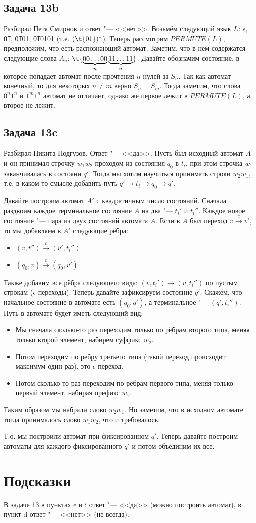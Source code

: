 \subsection{Задача 13b}
	Разбирал Петя Смирнов и ответ "--- <<нет>>.
	Возьмём следующий язык $L$: $\epsilon$, \t{01}, \t{0101}, \t{010101} (т.е. $(\t{01})^*$).
	Теперь рассмотрим $PERMUTE(L)$, предположим, что есть распознающий автомат.
	Заметим, что в нём содержатся следующие слова $A_n$: $\t{\underbrace{00\dots00}_{n}\underbrace{11\dots11}_{n}}$.
	Давайте обозначим состояние, в которое попадает автомат после прочтения $n$ нулей за $S_n$.
	Так как автомат конечный, то для некоторых $n \neq m$ верно $S_n=S_m$.
	Тогда заметим, что слова $0^n1^n$ и $1^m1^n$ автомат не отличает, однако же первое лежит в $PERMUTE(L)$,
	а второе не лежит.

\subsection{Задача 13c}
	Разбирал Никита Подгузов.
	Ответ "--- <<да>>.
	Пусть был исходный автомат $A$ и он принимал строчку $w_1w_2$ проходом
	из состояния $q_0$ в $t_i$, при этом строчка $w_1$ заканчивалась в состояни $q'$.
	Тогда мы хотим научиться принимать строки $w_2w_1$, т.е. в каком-то смысле добавить
	путь $q' \to t_i \to q_0 \to q'$.

	Давайте построим автомат $A'$ с квадратичным число состояний.
	Сначала раздвоим каждое терминальное состояние $A$ на два "--- $t_i'$ и $t_i''$.
	Каждое новое состояние "--- пара из двух состояний автомата $A$.
	Если в $A$ был переход $v \xrightarrow{c} v'$, то мы добавляем в $A'$ следующие рёбра:
	\begin{itemize}
		\item $(v, t'') \xrightarrow{c} (v', t_i'')$
		\item $(q_0, v) \xrightarrow{c} (q_0, v')$
	\end{itemize}
	Также добавим все рёбра следующего вида: $(v, t_i') \to (v, t_i'')$ по пустым строкам ($\epsilon$-переходы).
	Теперь давайте зафиксируем состояние $q'$.
	Скажем, что начальное состояние в автомате есть $(q_0, q')$, а терминальное "--- $(q', t_i'')$.
	Путь в автомате будет иметь следующий вид:
	\begin{itemize}
		\item
			Мы сначала сколько-то раз переходим только по рёбрам второго типа, меняя только второй элемент, набирем суффикс $w_2$.
		\item
			Потом переходим по ребру третьего типа (такой переход происходит максимум один раз), это $\epsilon$-переход.
		\item
			Потом сколько-то раз переходим по рёбрам первого типа, меняя только первый элемент, набирая префикс $w_1$.
	\end{itemize}
	Таким образом мы набрали слово $w_2w_1$.
	Но заметим, что в исходном автомате тогда принималось слово $w_1w_2$, что и требовалось.

	Т.о. мы построили автомат при фиксированном $q'$.
	Теперь давайте построим автоматы для каждого фиксированного $q'$ и потом объединим их все.

\section{Подсказки}
	В задаче 13 в пунктах e и i ответ "--- <<да>> (можно построить автомат), в пункт d ответ "--- <<нет>> (не всегда).

